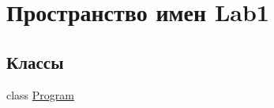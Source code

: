 \hypertarget{namespace_lab1}{}\section{Пространство имен Lab1}
\label{namespace_lab1}
\subsection*{Классы}
\begin{DoxyCompactItemize}
\item 
class \hyperlink{class_lab1_1_1_program}{Program}
\end{DoxyCompactItemize}
